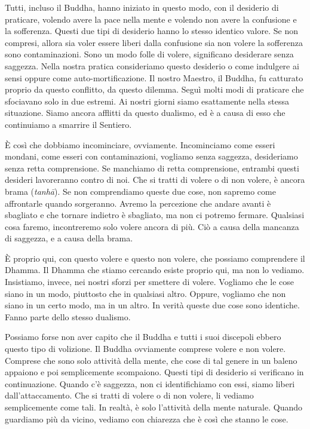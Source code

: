 Tutti, incluso il Buddha, hanno iniziato in questo modo, con il
desiderio di praticare, volendo avere la pace nella mente e volendo non
avere la confusione e la sofferenza. Questi due tipi di desiderio hanno
lo stesso identico valore. Se non compresi, allora sia voler essere
liberi dalla confusione sia non volere la sofferenza sono
contaminazioni. Sono un modo folle di volere, significano desiderare
senza saggezza. Nella nostra pratica consideriamo questo desiderio o
come indulgere ai sensi oppure come auto-mortificazione. Il nostro
Maestro, il Buddha, fu catturato proprio da questo conflitto, da questo
dilemma. Seguì molti modi di praticare che sfociavano solo in due
estremi. Ai nostri giorni siamo esattamente nella stessa situazione.
Siamo ancora afflitti da questo dualismo, ed è a causa di esso che
continuiamo a smarrire il Sentiero.

È così che dobbiamo incominciare, ovviamente. Incominciamo come esseri
mondani, come esseri con contaminazioni, vogliamo senza saggezza,
desideriamo senza retta comprensione. Se manchiamo di retta
comprensione, entrambi questi desideri lavoreranno contro di noi. Che si
tratti di volere o di non volere, è ancora brama (\emph{tanhā}). Se non
comprendiamo queste due cose, non sapremo come affrontarle quando
sorgeranno. Avremo la percezione che andare avanti è sbagliato e che
tornare indietro è sbagliato, ma non ci potremo fermare. Qualsiasi cosa
faremo, incontreremo solo volere ancora di più. Ciò a causa della
mancanza di saggezza, e a causa della brama.

È proprio qui, con questo volere e questo non volere, che possiamo
comprendere il Dhamma. Il Dhamma che stiamo cercando esiste proprio qui,
ma non lo vediamo. Insistiamo, invece, nei nostri sforzi per smettere di
volere. Vogliamo che le cose siano in un modo, piuttosto che in
qualsiasi altro. Oppure, vogliamo che non siano in un certo modo, ma in
un altro. In verità queste due cose sono identiche. Fanno parte dello
stesso dualismo.

Possiamo forse non aver capito che il Buddha e tutti i suoi discepoli
ebbero questo tipo di volizione. Il Buddha ovviamente comprese volere e
non volere. Comprese che sono solo attività della mente, che cose di tal
genere in un baleno appaiono e poi semplicemente scompaiono. Questi tipi
di desiderio si verificano in continuazione. Quando c'è saggezza, non ci
identifichiamo con essi, siamo liberi dall'attaccamento. Che si tratti
di volere o di non volere, li vediamo semplicemente come tali. In
realtà, è solo l'attività della mente naturale. Quando guardiamo più da
vicino, vediamo con chiarezza che è così che stanno le cose.

